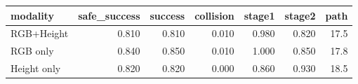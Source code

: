 \begin{tabular}{lrrrrrr}
\toprule
modality & safe_success & success & collision & stage1 & stage2 & path \\
\midrule
RGB+Height & 0.810 & 0.810 & 0.010 & 0.980 & 0.820 & 17.5 \\
RGB only & 0.840 & 0.850 & 0.010 & 1.000 & 0.850 & 17.8 \\
Height only & 0.820 & 0.820 & 0.000 & 0.860 & 0.930 & 18.5 \\
\bottomrule
\end{tabular}
